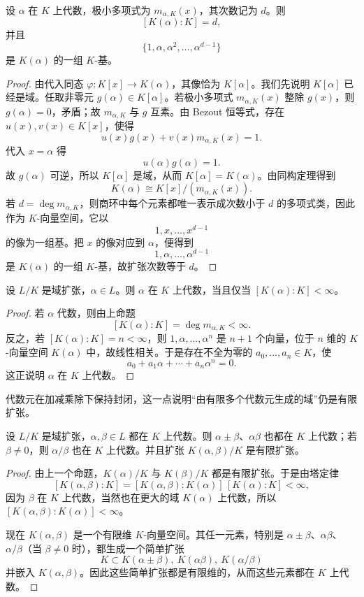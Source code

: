 \begin{proposition}
设 $\alpha$ 在 $K$ 上代数，极小多项式为 $m_{\alpha,K}(x)$，其次数记为 $d$。则
\[
[K(\alpha):K]=d,
\]
并且
\[
\{1,\alpha,\alpha^2,\dots,\alpha^{d-1}\}
\]
是 $K(\alpha)$ 的一组 $K$-基。
\end{proposition}

\begin{proof}
由代入同态 $\varphi:K[x]\to K(\alpha)$，其像恰为 $K[\alpha]$。我们先说明 $K[\alpha]$ 已经是域。任取非零元 $g(\alpha)\in K[\alpha]$。若极小多项式 $m_{\alpha,K}(x)$ 整除 $g(x)$，则 $g(\alpha)=0$，矛盾；故 $m_{\alpha,K}$ 与 $g$ 互素。由 Bezout 恒等式，存在 $u(x),v(x)\in K[x]$，使得
\[
u(x)g(x)+v(x)m_{\alpha,K}(x)=1.
\]
代入 $x=\alpha$ 得
\[
u(\alpha)g(\alpha)=1.
\]
故 $g(\alpha)$ 可逆，所以 $K[\alpha]$ 是域，从而 $K[\alpha]=K(\alpha)$。由同构定理得到
\[
K(\alpha)\cong K[x]/(m_{\alpha,K}(x)).
\]
若 $d=\deg m_{\alpha,K}$，则商环中每个元素都唯一表示成次数小于 $d$ 的多项式类，因此作为 $K$-向量空间，它以
\[
1,x,\dots,x^{d-1}
\]
的像为一组基。把 $x$ 的像对应到 $\alpha$，便得到
\[
1,\alpha,\dots,\alpha^{d-1}
\]
是 $K(\alpha)$ 的一组 $K$-基，故扩张次数等于 $d$。
\end{proof}

\begin{corollary}
设 $L/K$ 是域扩张，$\alpha\in L$。则 $\alpha$ 在 $K$ 上代数，当且仅当 $[K(\alpha):K]<\infty$。
\end{corollary}

\begin{proof}
若 $\alpha$ 代数，则由上命题
\[
[K(\alpha):K]=\deg m_{\alpha,K}<\infty.
\]
反之，若 $[K(\alpha):K]=n<\infty$，则 $1,\alpha,\dots,\alpha^n$ 是 $n+1$ 个向量，位于 $n$ 维的 $K$-向量空间 $K(\alpha)$ 中，故线性相关。于是存在不全为零的 $a_0,\dots,a_n\in K$，使
\[
a_0+a_1\alpha+\cdots+a_n\alpha^n=0.
\]
这正说明 $\alpha$ 在 $K$ 上代数。
\end{proof}

代数元在加减乘除下保持封闭，这一点说明“由有限多个代数元生成的域”仍是有限扩张。

\begin{proposition}
设 $L/K$ 是域扩张，$\alpha,\beta\in L$ 都在 $K$ 上代数。则 $\alpha\pm\beta$、$\alpha\beta$ 也都在 $K$ 上代数；若 $\beta\ne 0$，则 $\alpha/\beta$ 也在 $K$ 上代数。并且扩张 $K(\alpha,\beta)/K$ 是有限扩张。
\end{proposition}

\begin{proof}
由上一个命题，$K(\alpha)/K$ 与 $K(\beta)/K$ 都是有限扩张。于是由塔定律
\[
[K(\alpha,\beta):K]=[K(\alpha,\beta):K(\alpha)]\,[K(\alpha):K]<\infty,
\]
因为 $\beta$ 在 $K$ 上代数，当然也在更大的域 $K(\alpha)$ 上代数，所以 $[K(\alpha,\beta):K(\alpha)]<\infty$。

现在 $K(\alpha,\beta)$ 是一个有限维 $K$-向量空间。其任一元素，特别是 $\alpha\pm\beta$、$\alpha\beta$、$\alpha/\beta$（当 $\beta\ne0$ 时），都生成一个简单扩张
\[
K\subset K(\alpha\pm\beta),\ K(\alpha\beta),\ K(\alpha/\beta)
\]
并嵌入 $K(\alpha,\beta)$。因此这些简单扩张都是有限维的，从而这些元素都在 $K$ 上代数。
\end{proof}

